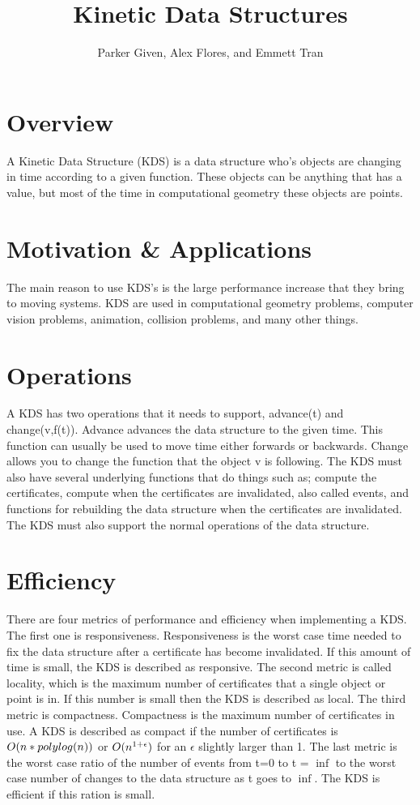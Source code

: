 \documentclass{article}
\title{Kinetic Data Structures}
\author{Parker Given, Alex Flores, and Emmett Tran}
\begin{document}
\maketitle


\section*{Overview}
A Kinetic Data Structure (KDS) is a data structure who's objects are changing in time according to a given function.  These objects can be anything that has a value, but most of the time in computational geometry these objects are points.  

\section*{Motivation \& Applications}
The main reason to use KDS's is the large performance increase that they bring to moving systems.  KDS are used in computational geometry problems, computer vision problems, animation, collision problems, and many other things. 

\section*{Operations}
A KDS has two operations that it needs to support, advance(t) and change(v,f(t)).  Advance advances the data structure to the given time.  This function can usually be used to move time either forwards or backwards.  Change allows you to change the function that the object v is following.  The KDS must also have several underlying functions that do things such as; compute the certificates, compute when the certificates are invalidated, also called events, and functions for rebuilding the data structure when the certificates are invalidated.  The KDS must also support the normal operations of the data structure.  


\section*{Efficiency}
There are four metrics of performance and efficiency when implementing a KDS.  The first one is responsiveness. Responsiveness is the worst case time needed to fix the data structure after a certificate has become invalidated.  If this amount of time is small, the KDS is described as responsive.  The second metric is called locality, which is the maximum number of certificates that a single object or point is in.  If this number is small then the KDS is described as local.  The third metric is compactness.  Compactness is the maximum number of certificates in use.  A KDS is described as compact if the number of certificates is $\boldmath{O(n *polylog (n))}$ or $\boldmath{O(n^{1+\epsilon})}$ for an $\epsilon$ slightly larger than 1.  The last metric is the worst case ratio of the number of events from t=0 to t = $\inf$ to the worst case number of changes to the data structure as t goes to $\inf$.  The KDS is efficient if this ration is small. 
\end{document}

